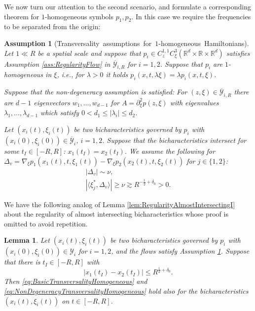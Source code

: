 \documentclass{amsart}
\newtheorem{lemma}[theorem]{Lemma}
\newtheorem{assumption}[theorem]{Assumption}
\theoremstyle{definition}
\newcommand{\R}{\mathbb{R}}
\begin{document}
We now turn our attention to the second scenario, and formulate a corresponding theorem for $1$-homogeneous symbols $p_1,p_2$. In this case we require the frequencies to be separated from the origin:
\begin{assumption}[Transversality~assumptions~for~$1$-homogeneous~Hamiltonians]
\label{AssumptionNondegenerateHamiltonianHomogeneous}
Let $1 \ll R$ be a spatial scale and suppose that $p_i \in C_{z}^{1,1} C^3_{\xi}(\R^d \times \R \times \R^d)$ satisfies Assumption \ref{ass:RegularityFlow} in $\overline{\mathcal{Y}}_{i,R}$ for $i=1,2$. Suppose that $p_i$ are $1$-homogeneous in $\xi$, i.e., for $\lambda > 0$ it holds $p_i(x,t,\lambda \xi) = \lambda p_i(x,t,\xi)$.

Suppose that the non-degeneracy assumption is satisfied: For $(z,\xi) \in \overline{\mathcal{Y}}_{i,R}$  there are $d-1$ eigenvectors $w_1,\ldots,w_{d-1}$ for $A = \partial^2_{\xi} p(z,\xi)$ with eigenvalues $\lambda_1,\ldots,\lambda_{d-1}$ which satisfy $0< d_1 \leq |\lambda_i| \leq d_2$.

\smallskip

Let $(x_i(t),\xi_i(t))$ be two bicharacteristics governed by $p_i$ with $(x_i(0),\xi_i(0)) \in \overline{\mathcal{Y}}_i$, $i=1,2$. Suppose that the bicharacteristics  intersect for some $t_I \in [-R,R]$: $x_1(t_I) = x_2(t_I)$. 
We assume the following for $\Delta_v = \nabla_{\xi} p_1(x_1(t),t,\xi_1(t)) - \nabla_{\xi} p_2(x_2(t),t,\xi_2(t))$ for $j \in \{1,2\}$:
\begin{align}
\label{eq:BasicTransversalityHomogeneous}
|\Delta_v| \sim \nu, \\
\label{eq:NonDegeneracyTransversalityHomogeneous}
| \langle \xi_j^*, \Delta_v \rangle | \geq \nu \gtrsim R^{-\frac{1}{2}+\delta_0} >0.
\end{align}
\end{assumption}

We have the following analog of Lemma \ref{lem:RegularityAlmostIntersectingI} about the regularity of almost intersecting bicharacteristics whose proof is omitted to avoid repetition.

\begin{lemma}
Let $(x_i(t),\xi_i(t))$ be two bicharacteristics governed by $p_i$ with \\ $(x_i(0),\xi_i(0)) \in \mathcal{Y}_i$ for $i=1,2$, and the flows satisfy Assumption \ref{AssumptionNondegenerateHamiltonianHomogeneous}. Suppose that there is $t_I \in [-R,R]$ with 
\begin{equation*}
|x_1(t_I) - x_2(t_I)| \leq R^{\frac{1}{2}+\delta_0}.
\end{equation*}
Then \eqref{eq:BasicTransversalityHomogeneous} and \eqref{eq:NonDegeneracyTransversalityHomogeneous} hold also for the bicharacteristics $(x_i(t),\xi_i(t))$ on $t \in [-R,R]$.

\end{lemma}
\end{document}
